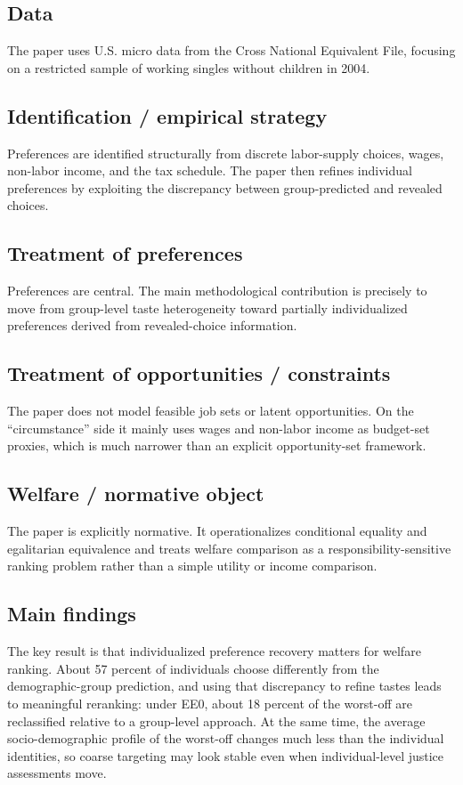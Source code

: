 \documentclass[11pt,a4paper]{article}
\begin{document}
\subsection*{Data}
The paper uses U.S. micro data from the Cross National Equivalent File, focusing on a restricted sample of working singles without children in 2004.

\subsection*{Identification / empirical strategy}
Preferences are identified structurally from discrete labor-supply choices, wages, non-labor income, and the tax schedule. The paper then refines individual preferences by exploiting the discrepancy between group-predicted and revealed choices.

\subsection*{Treatment of preferences}
Preferences are central. The main methodological contribution is precisely to move from group-level taste heterogeneity toward partially individualized preferences derived from revealed-choice information.

\subsection*{Treatment of opportunities / constraints}
The paper does not model feasible job sets or latent opportunities. On the “circumstance” side it mainly uses wages and non-labor income as budget-set proxies, which is much narrower than an explicit opportunity-set framework.

\subsection*{Welfare / normative object}
The paper is explicitly normative. It operationalizes conditional equality and egalitarian equivalence and treats welfare comparison as a responsibility-sensitive ranking problem rather than a simple utility or income comparison.

\subsection*{Main findings}
The key result is that individualized preference recovery matters for welfare ranking. About 57 percent of individuals choose differently from the demographic-group prediction, and using that discrepancy to refine tastes leads to meaningful reranking: under EE0, about 18 percent of the worst-off are reclassified relative to a group-level approach. At the same time, the average socio-demographic profile of the worst-off changes much less than the individual identities, so coarse targeting may look stable even when individual-level justice assessments move.
\end{document}
